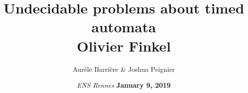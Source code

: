 \documentclass[page number]{beamer}
\def\outline{
  \begin{frame}[plain,noframenumbering]
    \frametitle{Outline}
    \tableofcontents[currentsection]
  \end{frame}
}
\begin{document}
\title{Undecidable problems about timed automata\\ Olivier Finkel}

\author{Aur\`ele Barri\`ere \& Joshua Peignier}

\date{\textit{ENS Rennes}
  \vfill
  \textbf{January 9, 2019}}

\def\outline{
  \begin{frame}[plain,noframenumbering]
    \frametitle{Outline}
    \tableofcontents[currentsection]
  \end{frame}
}

\begin{frame}
  \vspace{-2cm}
  \maketitle
  \vspace{-4cm}
\end{frame}




\end{document}
